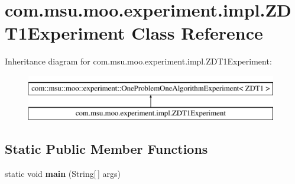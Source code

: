 \hypertarget{classcom_1_1msu_1_1moo_1_1experiment_1_1impl_1_1ZDT1Experiment}{\section{com.\-msu.\-moo.\-experiment.\-impl.\-Z\-D\-T1\-Experiment Class Reference}
\label{classcom_1_1msu_1_1moo_1_1experiment_1_1impl_1_1ZDT1Experiment}
}
Inheritance diagram for com.\-msu.\-moo.\-experiment.\-impl.\-Z\-D\-T1\-Experiment\-:\begin{figure}[H]
\begin{center}
\leavevmode
\includegraphics[height=2.000000cm]{classcom_1_1msu_1_1moo_1_1experiment_1_1impl_1_1ZDT1Experiment}
\end{center}
\end{figure}
\subsection*{Static Public Member Functions}
\begin{DoxyCompactItemize}
\item 
\hypertarget{classcom_1_1msu_1_1moo_1_1experiment_1_1impl_1_1ZDT1Experiment_a482e07eac73ecb0612416905379529f8}{static void {\bfseries main} (String\mbox{[}$\,$\mbox{]} args)}\label{classcom_1_1msu_1_1moo_1_1experiment_1_1impl_1_1ZDT1Experiment_a482e07eac73ecb0612416905379529f8}

\end{DoxyCompactItemize}
